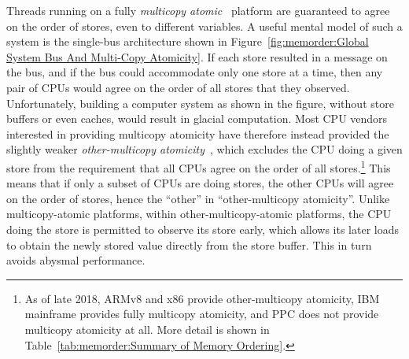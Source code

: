 Threads running on a fully
\emph{multicopy atomic}~\cite{Stone:1995:SP:623262.623912}
platform are guaranteed
to agree on the order of stores, even to different variables.
A useful mental model of such a system is the single-bus architecture
shown in
Figure~\ref{fig:memorder:Global System Bus And Multi-Copy Atomicity}.
If each store resulted in a message on the bus, and if the bus could
accommodate only one store at a time, then any pair of CPUs would
agree on the order of all stores that they observed.
Unfortunately, building a computer system as shown in the figure,
without store buffers or even caches, would result in glacial computation.
Most CPU vendors interested in providing multicopy atomicity have therefore
instead provided the slightly weaker
\emph{other-multicopy atomicity}~\cite[Section B2.3]{ARMv8A:2017},
which excludes the CPU doing a given store from the requirement that all
CPUs agree on the order of all stores.\footnote{
	As of late 2018, ARMv8 and x86 provide other-multicopy atomicity,
	IBM mainframe provides fully multicopy atomicity, and PPC does
	not provide multicopy atomicity at all. More detail is shown in
	Table~\ref{tab:memorder:Summary of Memory Ordering}.}
This means that if only a subset of CPUs are doing stores, the
other CPUs will agree on the order of stores, hence the ``other''
in ``other-multicopy atomicity''.
Unlike multicopy-atomic platforms, within other-multicopy-atomic platforms,
the CPU doing the store is permitted to observe its
store early, which allows its later loads to obtain the newly stored
value directly from the store buffer.
This in turn avoids abysmal performance.

